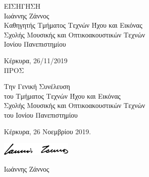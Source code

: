 \documentclass[a4, 11pt]{article}
\begin{document}
\begin{multicols}{2}
\noindent
\vspace{0.5cm}
ΕΙΣΗΓΗΣΗ\\
\noindent
Ιωάννης Ζάννος\\
Καθηγητής Τμήματος Τεχνών Ήχου και Εικόνας\\
Σχολής Μουσικής και Οπτικοακουστικών Τεχνών\\
Ιονίου Πανεπιστημίου

\vspace*{0.5cm}
\noindent
Κέρκυρα, 26/11/2019\\


\columnbreak
\noindent
ΠΡΟΣ

\vspace{0.5cm}
\noindent
Την Γενική Συνέλευση\\
του Τμήματος Τεχνών Ήχου και Εικόνας\\
Σχολής Μουσικής και Οπτικοακουστικών Τεχνών\\
του Ιονίου Πανεπιστημίου

\vspace{1cm}



\vspace{1cm}
\parindent=0.5cm
Κέρκυρα,  26 Νοεμβρίου 2019.

\vspace{0.5cm}

\includegraphics[width=3.5cm]{signature}

\vspace{0.5cm}
\parindent=1cm
Ιωάννης Ζάννος

\end{multicols}
\end{document}
